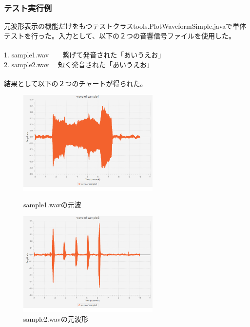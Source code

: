 \documentclass[a4j]{jarticle}
\begin{document}
\subsubsection{テスト実行例}

元波形表示の機能だけをもつテストクラスtools.PlotWaveformSimple.javaで単体テストを行った。入力として、以下の２つの音響信号ファイルを使用した。\\
　\\
1. sample1.wav　　繋げて発音された「あいうえお」\\
2. sample2.wav　 短く発音された「あいうえお」\\
　\\
結果として以下の２つのチャートが得られた。

\begin{figure}[htbp]
 \begin{minipage}{0.5\hsize}
  \begin{center}
   \includegraphics[width=70mm]{wave1.eps}
  \end{center}
  \caption{sample1.wavの元波}
  \label{fig:one}
 \end{minipage}
 \begin{minipage}{0.5\hsize}
  \begin{center}
   \includegraphics[width=70mm]{wave2.eps}
  \end{center}
  \caption{sample2.wavの元波形}
  \label{fig:two}
 \end{minipage}
\end{figure}
\end{document}
